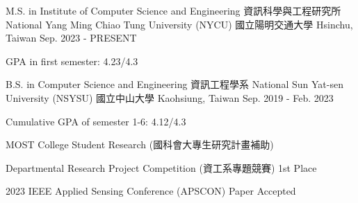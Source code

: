 

\begin{cventries}

  \cventry
    {M.S. in Institute of Computer Science and Engineering 資訊科學與工程研究所} %
    {National Yang Ming Chiao Tung University (NYCU) 國立陽明交通大學} %
    {Hsinchu, Taiwan} %
    {Sep. 2023 - PRESENT} %
    {
      \begin{cvitems} %
        \item {GPA in first semester: 4.23/4.3}
      \end{cvitems}
    }

  \cventry
    {B.S. in Computer Science and Engineering 資訊工程學系} %
    {National Sun Yat-sen University (NSYSU) 國立中山大學} %
    {Kaohsiung, Taiwan} %
    {Sep. 2019 - Feb. 2023} %
    {
      \begin{cvitems} %
        \item {Cumulative GPA of semester 1-6: 4.12/4.3}
        \item {MOST College Student Research (國科會大專生研究計畫補助)}
        \item {Departmental Research Project Competition (資工系專題競賽) 1st Place}
        \item {2023 IEEE Applied Sensing Conference (APSCON) Paper Accepted}
      \end{cvitems}
    }

\end{cventries}
